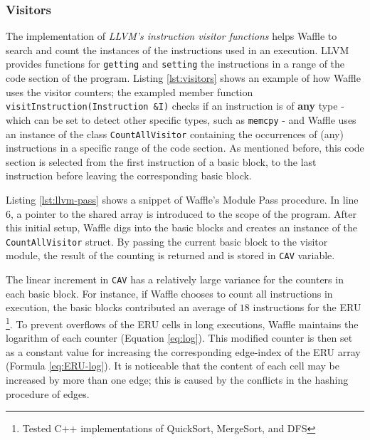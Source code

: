 \subsubsection{Visitors}

The implementation of \textit{LLVM's instruction visitor functions} \cite{inst_visitor} helps Waffle to search and count the instances of the instructions used in an execution. LLVM provides functions for \texttt{getting} and \texttt{setting} the instructions in a range of the code section of the program. Listing \ref{lst:visitors} shows an example of how Waffle uses the visitor counters; the exampled member function \texttt{visitInstruction(Instruction \&I)} checks if an instruction is of \textbf{any} type - which can be set to detect other specific types, such as \texttt{memcpy} - and Waffle uses an instance of the class \texttt{CountAllVisitor} containing the occurrences of (any) instructions in a specific range of the code section. As mentioned before, this code section is selected from the first instruction of a basic block, to the last instruction before leaving the corresponding basic block.




Listing \ref{lst:llvm-pass} shows a snippet of Waffle's Module Pass procedure. In line 6, a pointer to the shared array is introduced to the scope of the program. After this initial setup, Waffle digs into the basic blocks and creates an instance of the \texttt{CountAllVisitor} struct. By passing the current basic block to the visitor module, the result of the counting is returned and is stored in \texttt{CAV} variable.




The linear increment in \texttt{CAV} has a relatively large variance for the counters in each basic block. For instance, if Waffle chooses to count all instructions in execution, the basic blocks contributed an average of $18$ instructions for the ERU \footnote{Tested C++ implementations of QuickSort, MergeSort, and DFS}. To prevent overflows of the ERU cells in long executions, Waffle maintains the logarithm of each counter (Equation \ref{eq:log}). This modified counter is then set as a constant value for increasing the corresponding edge-index of the ERU array (Formula \ref{eq:ERU-log}). It is noticeable that the content of each cell may be increased by more than one edge; this is caused by the conflicts in the hashing procedure of edges.

